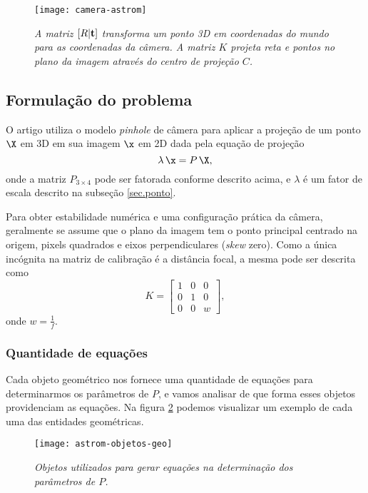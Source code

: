 \begin{figure}[!htb]
\centering
\texttt{[image: camera-astrom]}
\caption{{\it A matriz $[R|{\bf t}]$ transforma um ponto 3D em coordenadas do mundo para as coordenadas da câmera. A matriz $K$ projeta reta e pontos no plano da imagem através do centro de projeção $C$.}}
\label{fig.camera-astrom}
\end{figure}

\subsection{Formulação do problema}

O artigo utiliza o modelo {\it pinhole} de câmera para aplicar a projeção de um ponto $\X$ em 3D em sua imagem $\x$ em 2D dada pela equação de projeção
\begin{equation}\label{eq.projecao}
\lambda\,\x=P\,\X,
\end{equation}
onde a matriz $P_{3\times4}$ pode ser fatorada conforme descrito acima, e $\lambda$ é um fator de escala descrito na subseção \ref{sec.ponto}. 

Para obter estabilidade numérica e uma configuração prática da câmera, geralmente se assume que o plano da imagem tem o ponto principal centrado na origem, pixels quadrados e eixos perpendiculares ({\it skew} zero). Como a única incógnita na matriz de calibração é a distância focal, a mesma pode ser descrita como
\begin{equation}\label{eq.astrom-K}
K=
\begin{bmatrix}
1&0&0\\
0&1&0\\
0&0&w
\end{bmatrix},
\end{equation}
onde $w=\frac{1}{f}$.

\subsubsection{Quantidade de equações}

Cada objeto geométrico nos fornece uma quantidade de equações para determinarmos os parâmetros de $P$, e vamos analisar de que forma esses objetos providenciam as equações. Na figura \ref{fig.astrom-objetos-geo} podemos visualizar um exemplo de cada uma das entidades geométricas.

\begin{figure}[!htb]
\centering
\texttt{[image: astrom-objetos-geo]}
\caption{{\it Objetos utilizados para gerar equações na determinação dos parâmetros de $P$.}}
\label{fig.astrom-objetos-geo}
\end{figure}

